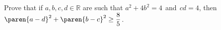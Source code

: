 Prove that if $a, b, c, d \in \mathbb{R}$
are such that $a^2 + 4b^2 = 4 \mspace{2mu}$ and $ \mspace{2mu} cd = 4$,
then $\paren{a - d}^2 + \paren{b - c}^2 \geq \dfrac{8}{5}$.

